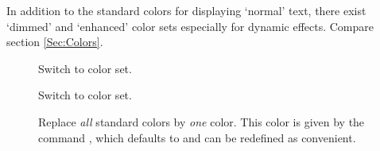  \newslide

  In addition to the standard colors for displaying `normal' text, there exist `dimmed' and `enhanced' color sets
  especially for dynamic effects. Compare section \ref{Sec:Colors}.
  \begin{description}
  \item[] Switch to  color set.
  \item[] Switch to  color set.
  \item[] Replace \emph{all} standard colors by \emph{one} color. This color is given
    by the command , which defaults to  and can be redefined as convenient.
  \end{description}
  

  \newslide

